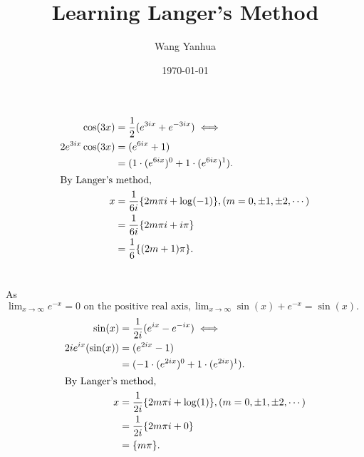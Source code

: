 \documentclass[11pt,reqno,oneside,a4paper]{article}
\author{Wang Yanhua}
\title{Learning Langer's Method}
\date{\today}
\begin{document}
\maketitle
\thispagestyle{fancy}

\section{}

\begin{align*}
\cos(3x) &= \frac{1}{2}(e^{3ix} + e^{-3ix}) \iff\\
2e^{3ix} \cos(3x) &= (e^{6ix} + 1) \\
&= (1 \cdot (e^{6ix})^0  + 1 \cdot (e^{6ix})^1). \\
\intertext{By Langer's method,}
x &= \frac{1}{6i}\{2m \pi i + \log(-1)\} , (m=0, \pm 1, \pm 2, \cdots)\\
&= \frac{1}{6i}\{2m \pi i + i\pi\}\\
&=  \frac{1}{6}\{(2m+1)\pi\}.
\end{align*}

\section{}

As $\lim_{x \to \infty}   e^{-x} = 0 \text{ on the positive real axis}, \lim_{x \to \infty} \sin(x)+e^{-x} = \sin(x).$
\begin{align*}
\sin(x) &= \frac{1}{2i}(e^{ix}-e^{-ix}) \iff \\
2ie^{ix} (\sin(x)) &= (e^{2ix} - 1) \\
&=  (-1 \cdot (e^{2ix})^0 + 1 \cdot (e^{2ix})^1).\\
\intertext{By Langer's method,}
x &= \frac{1}{2i}\{2m \pi i + \log(1)\}  , (m=0, \pm 1, \pm 2, \cdots)\\
&= \frac{1}{2i}\{2m \pi i + 0\} \\
&= \{m \pi\}.
\end{align*}

\section{}
\end{document}
